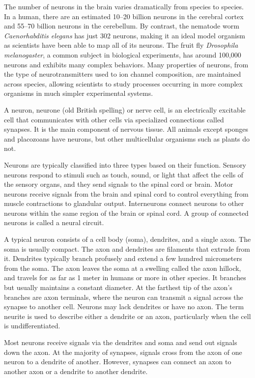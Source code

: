 \documentclass[]{book}
\begin{document}
The number of neurons in the brain varies dramatically from species to species. In a human, there are an estimated 10--20 billion neurons in the cerebral cortex and 55--70 billion neurons in the cerebellum. By contrast, the nematode worm \emph{Caenorhabditis elegans} has just 302 neurons, making it an ideal model organism as scientists have been able to map all of its neurons. The fruit fly \emph{Drosophila melanogaster}, a common subject in biological experiments, has around 100,000 neurons and exhibits many complex behaviors. Many properties of neurons, from the type of neurotransmitters used to ion channel composition, are maintained across species, allowing scientists to study processes occurring in more complex organisms in much simpler experimental systems.

A neuron, neurone (old British spelling) or nerve cell, is an electrically excitable cell that communicates with other cells via specialized connections called synapses. It is the main component of nervous tissue. All animals except sponges and placozoans have neurons, but other multicellular organisms such as plants do not.

Neurons are typically classified into three types based on their function. Sensory neurons respond to stimuli such as touch, sound, or light that affect the cells of the sensory organs, and they send signals to the spinal cord or brain. Motor neurons receive signals from the brain and spinal cord to control everything from muscle contractions to glandular output. Interneurons connect neurons to other neurons within the same region of the brain or spinal cord. A group of connected neurons is called a neural circuit.

A typical neuron consists of a cell body (soma), dendrites, and a single axon. The soma is usually compact. The axon and dendrites are filaments that extrude from it. Dendrites typically branch profusely and extend a few hundred micrometers from the soma. The axon leaves the soma at a swelling called the axon hillock, and travels for as far as 1 meter in humans or more in other species. It branches but usually maintains a constant diameter. At the farthest tip of the axon's branches are axon terminals, where the neuron can transmit a signal across the synapse to another cell. Neurons may lack dendrites or have no axon. The term neurite is used to describe either a dendrite or an axon, particularly when the cell is undifferentiated.

Most neurons receive signals via the dendrites and soma and send out signals down the axon. At the majority of synapses, signals cross from the axon of one neuron to a dendrite of another. However, synapses can connect an axon to another axon or a dendrite to another dendrite.
\end{document}
